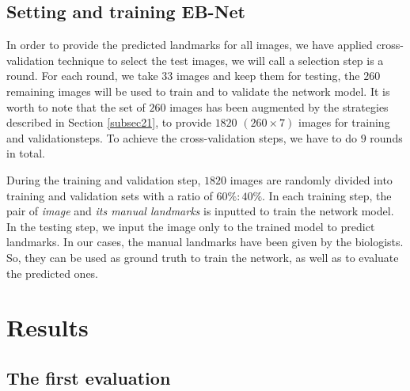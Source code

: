 \documentclass[review]{elsarticle}
\begin{document}
\subsection{Setting and training EB-Net}
\label{subsec23}
In order to provide the predicted landmarks for all images, we have applied cross-validation technique to select the test images, we will call a selection step is a round. For each round, we take $33$ images and keep them for testing, the $260$ remaining images will be used to train and to validate the network model. It is worth to note that the set of $260$ images has been augmented by the strategies described in Section \ref{subsec21}, to provide $1820$ $(260 \times 7)$ images for training and validationsteps. To achieve the cross-validation steps, we have to do $9$ rounds in total. 

During the training and validation step, $1820$ images are randomly divided into training and validation sets with a ratio of $60\%:40\%$. In each training step, the pair of \textit{image} and \textit{its manual landmarks} is inputted to train the network model. In the testing step, we input the image only to the trained model to predict landmarks. In our cases, the manual landmarks have been given by the biologists. So, they can be used as ground truth to train the network, as well as to evaluate the predicted ones. 

\section{Results}
\label{sec3}
\subsection{The first evaluation}
\label{subsec31}

\end{document}
